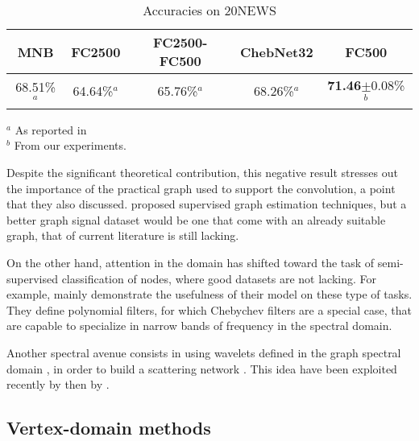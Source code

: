 \begin{table}[H]
  \caption{Accuracies on 20NEWS}
  \begin{center}
    \bgroup
    \def\arraystretch{1.5}%
    \begin{tabular}{|c|c|c|c|c|}
      \hline
      MNB & FC2500 & FC2500-FC500 & ChebNet32 & FC500\\
      \hline
      68.51\%$^a$ & 64.64\%$^a$ & 65.76\%$^a$ & 68.26\%$^a$ & \textbf{71.46}$\pm$0.08\%$^b$\\
      \hline
    \end{tabular}
    \egroup
  \end{center}
\begin{flushleft}
\footnotesize{
$^a$ As reported in \cite{defferrard2016convolutional}\\
$^b$ From our experiments.
}
\end{flushleft}
  \label{tab:20}
\end{table}

Despite the significant theoretical contribution, this negative result stresses out the importance of the practical graph used to support the convolution, a point that they also discussed. \cite{henaff2015deep} proposed supervised graph estimation techniques, but a better graph signal dataset would be one that come with an already suitable graph, that of current literature is still lacking.

On the other hand, attention in the domain has shifted toward the task of semi-supervised classification of nodes, where good datasets are not lacking. For example, \cite{levie2017cayleynets} mainly demonstrate the usefulness of their model on these type of tasks. They define polynomial filters, for which Chebychev filters are a special case, that are capable to specialize in narrow bands of frequency in the spectral domain.

Another spectral avenue consists in using wavelets defined in the graph spectral domain \citep{hammond2011wavelets}, in order to build a scattering network \citep{bruna2013invariant,chen2014unsupervised}. This idea have been exploited recently by \cite{zou2018Graph} then by \cite{gama2018Diffusion}.

\subsection{Vertex-domain methods}
\label{sec:vert}

